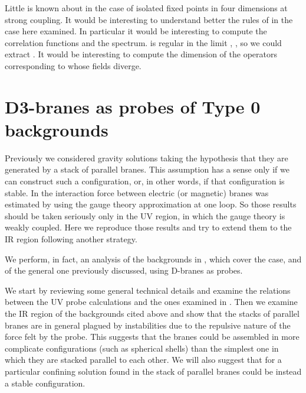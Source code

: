 \documentclass[a4paper,12pt]{article}
\begin{document}
Little is known about \coordHE{} in the case of isolated fixed points in four dimensions
at strong coupling. It would be interesting to understand better the rules of \coordHE{}
in the case here examined. In particular it would be interesting to compute the correlation functions and the spectrum. \coordHE{} is regular in the limit \coordHE{}, 
\myHighlight{$\phi\rightarrow\infty$}\coordHE{}, so we could extract \coordHE{}. It would be interesting to compute the dimension of the operators corresponding to \coordHE{} whose fields diverge.







\section{D3-branes as probes of Type 0 backgrounds}

Previously we considered gravity solutions taking the hypothesis that they
are generated by a stack of parallel branes. This assumption has a sense only 
if we can construct such a configuration, or, in other words, if that configuration is stable. In \cite{tz} the interaction force between electric
(or magnetic) branes was estimated by using the gauge theory approximation at one
loop. So those results should be taken seriously only in the UV region,
 in which the gauge theory is weakly coupled. Here we reproduce
those results and try to extend them to the IR region following another strategy.

We perform, in fact, an analysis of the backgrounds in \cite{kt0}, \cite{minahan} which cover the \coordHE{} case, and of the general one previously discussed, using D-branes as probes.

We start by reviewing  some general technical details and examine the relations between the UV probe calculations and the ones examined in \cite{tz}. Then we examine the IR region of the backgrounds cited above and show that the stacks of parallel branes are in general plagued by instabilities due to the repulsive nature of the force felt by the probe. This suggests that the branes could be assembled in more complicate configurations (such as spherical shells)
than the simplest one in which they are stacked parallel to each other.
We will also suggest that for a particular confining solution found in \cite{minahan} the stack of parallel branes could be instead a stable configuration.
\end{document}
